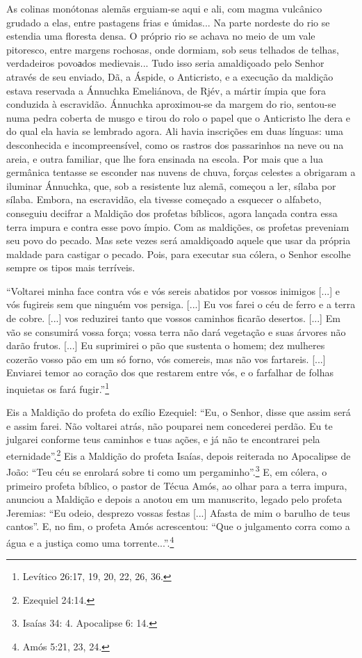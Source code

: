 As colinas monótonas alemãs erguiam-se aqui e ali, com magma vulcânico
grudado a elas, entre pastagens frias e úmidas... Na parte nordeste do
rio se estendia uma floresta densa. O próprio rio se achava no meio de
um vale pitoresco, entre margens rochosas, onde dormiam, sob seus
telhados de telhas, verdadeiros povoаdos medievais... Tudo isso seria
amaldiçoado pelo Senhor através de seu enviado, Dã, a Áspide, o
Anticristo, e a execução da maldição estava reservada a Ánnuchka
Emeliánova, de Rjév, a mártir ímpia que fora conduzida à escravidão.
Ánnuchka aproximou-se da margem do rio, sentou-se numa pedra coberta de
musgo e tirou do rolo o papel que o Anticristo lhe dera e do qual ela
havia se lembrado agora. Ali havia inscrições em duas línguas: uma
desconhecida e incompreensível, como os rastros dos passarinhos na neve
ou na areia, e outra familiar, que lhe fora ensinada na escola. Por mais
que a lua germânica tentasse se esconder nas nuvens de chuva, forças
celestes a obrigaram a iluminar Ánnuchka, que, sob a resistente luz
alemã, começou a ler, sílaba por sílaba. Embora, na escravidão, ela
tivesse começado a esquecer o alfabeto, conseguiu decifrar a Maldição
dos profetas bíblicos, agora lançada contra essa terra impura e contra
esse povo ímpio. Com as maldições, os profetas preveniam seu povo do
pecado. Mas sete vezes será amaldiçoadо aquele que usar da própria
maldade para castigar o pecado. Pois, para executar sua cólera, o Senhor
escolhe sempre os tipos mais terríveis.

``Voltarei minha face contra vós e vós sereis abatidos por vossos
inimigos {[}...{]} e vós fugireis sem que ninguém vos persiga. {[}...{]}
Eu vos farei o céu de ferro e a terra de cobre. {[}...{]} vos reduzirei
tanto que vossos caminhos ficarão desertos. {[}...{]} Em vão se
consumirá vossa força; vossa terra não dará vegetação e suas árvores não
darão frutos. {[}...{]} Eu suprimirei o pão que sustenta o homem; dez
mulheres cozerão vosso pão em um só forno, vós comereis, mas não vos
fartareis. {[}...{]} Enviarei temor ao coração dos que restarem entre
vós, e o farfalhar de folhas inquietas os fará fugir.''\footnote{Levítico
  26:17, 19, 20, 22, 26, 36.}

Eis a Maldição do profeta do exílio Ezequiel: ``Eu, o Senhor, disse que
assim será e assim farei. Não voltarei atrás, não pouparei nem
concederei perdão. Eu te julgarei conforme teus caminhos e tuas ações, e
já não te encontrarei pela eternidade''.\footnote{Ezequiel 24:14.} Eis a
Maldição do profeta Isaías, depois reiterada no Apocalipse de João:
``Teu céu se enrolará sobre ti como um pergaminho''.\footnote{Isaías 34:
  4. Apocalipse 6: 14.} E, em cólera, o primeiro profeta bíblico, o
pastor de Técua Amós, ao olhar para a terra impura, anunciou a Maldição
e depois a anotou em um manuscrito, legado pelo profeta Jeremias: ``Eu
odeio, desprezo vossas festas {[}...{]} Afasta de mim o barulho de teus
cantos''. E, no fim, o profeta Amós acrescentou: ``Que o julgamento
corra como a água e a justiça como uma torrente...''.\footnote{Amós
  5:21, 23, 24.}

